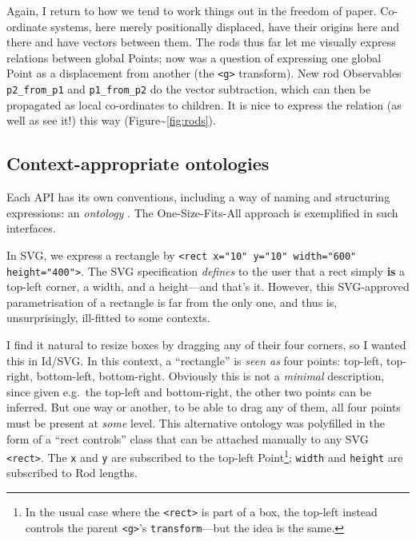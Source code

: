 Again, I return to how we tend to work things out in the freedom of
paper. Co-ordinate systems, here merely positionally displaced, have
their origins here and there and have vectors between them. The rods
thus far let me visually express relations between global Points; now
was a question of expressing one global Point as a displacement from
another (the \texttt{\textless{}g\textgreater{}} transform). New rod
Observables \texttt{p2\_from\_p1} and \texttt{p1\_from\_p2} do the
vector subtraction, which can then be propagated as local co-ordinates
to children. It is nice to express the relation (as well as see it!)
this way (Figure\textasciitilde{}\ref{fig:rods}).

\hypertarget{context-appropriate-ontologies}{%
\subsection{Context-appropriate
ontologies}\label{context-appropriate-ontologies}}

Each API has its own conventions, including a way of naming and
structuring expressions: an \emph{ontology} \cite{crit-semprola}. The
One-Size-Fits-All{} approach is exemplified in such interfaces.

In SVG, we express a rectangle by
\texttt{\textless{}rect x="10" y="10" width="600" height="400"\textgreater{}}.
The SVG specification \emph{defines} to the user that a rect simply
\textbf{is} a top-left corner, a width, and a height---and that's it.
However, this SVG-approved parametrisation of a rectangle is far from
the only one, and thus is, unsurprisingly, ill-fitted to some contexts.

I find it natural to resize boxes by dragging any of their four corners,
so I wanted this in Id{}/SVG. In this context, a ``rectangle'' is
\emph{seen as} four points: top-left, top-right, bottom-left,
bottom-right. Obviously this is not a \emph{minimal} description, since
given e.g.~the top-left and bottom-right, the other two points can be
inferred. But one way or another, to be able to drag any of them, all
four points must be present at \emph{some} level. This alternative
ontology was polyfilled in the form of a ``rect controls'' class that
can be attached manually to any SVG
\texttt{\textless{}rect\textgreater{}}. The \texttt{x} and \texttt{y}
are subscribed to the top-left Point\footnote{In the usual case where
  the \texttt{\textless{}rect\textgreater{}} is part of a box, the
  top-left instead controls the parent
  \texttt{\textless{}g\textgreater{}}'s \texttt{transform}---but the
  idea is the same.}; \texttt{width} and \texttt{height} are subscribed
to Rod lengths.

